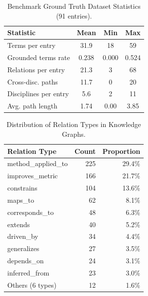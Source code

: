 \begin{table}[t]
\centering
\caption{Benchmark Ground Truth Dataset Statistics (91 entries).}
\label{tab:benchmark_stats}
\begin{tabular}{lccc}
\toprule
\textbf{Statistic} & \textbf{Mean} & \textbf{Min} & \textbf{Max} \\
\midrule
Terms per entry          & 31.9 & 18 & 59 \\
Grounded terms rate      & 0.238 & 0.000 & 0.524 \\
Relations per entry      & 21.3 & 3 & 68 \\
Cross-disc. paths        & 11.7 & 0 & 20 \\
Disciplines per entry    & 5.6 & 2 & 11 \\
Avg. path length         & 1.74 & 0.00 & 3.85 \\
\bottomrule
\end{tabular}
\end{table}

\begin{table}[t]
\centering
\caption{Distribution of Relation Types in Knowledge Graphs.}
\label{tab:relation_types}
\begin{tabular}{lrr}
\toprule
\textbf{Relation Type} & \textbf{Count} & \textbf{Proportion} \\
\midrule
method\_applied\_to & 225 & 29.4\% \\
improves\_metric & 166 & 21.7\% \\
constrains & 104 & 13.6\% \\
maps\_to & 62 & 8.1\% \\
corresponds\_to & 48 & 6.3\% \\
extends & 40 & 5.2\% \\
driven\_by & 34 & 4.4\% \\
generalizes & 27 & 3.5\% \\
depends\_on & 24 & 3.1\% \\
inferred\_from & 23 & 3.0\% \\
\midrule
Others (6 types) & 12 & 1.6\% \\
\bottomrule
\end{tabular}
\end{table}



